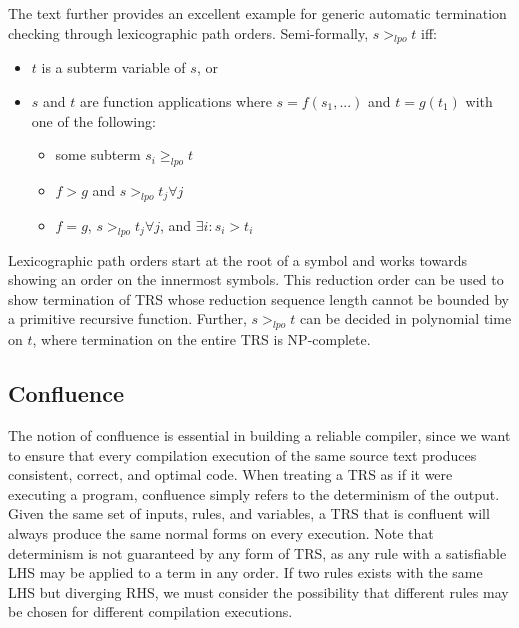 \documentclass{article}
\begin{document}
The text further provides an excellent example for generic automatic termination checking through lexicographic path orders. Semi-formally, $s >_{lpo} t$ iff:
\begin{itemize}
    \item $t$ is a subterm variable of $s$, or
    \item $s$ and $t$ are function applications where $s = f(s_1, ...)$ and $t = g(t_1)$ with one of the following:
    \begin{itemize}
        \item some subterm $s_i \geq_{lpo} t$
        \item $f > g$ and $s >_{lpo} t_j \forall j$
        \item $f = g$, $s >_{lpo} t_j \forall j$, and $\exists i: s_i > t_i$
    \end{itemize}
\end{itemize}
Lexicographic path orders start at the root of a symbol and works towards showing an order on the innermost symbols.
This reduction order can be used to show termination of TRS whose reduction sequence length cannot be bounded by a primitive recursive function.
Further, $s >_{lpo} t$ can be decided in polynomial time on $t$, where termination on the entire TRS is NP-complete.



\subsection{Confluence}
The notion of confluence is essential in building a reliable compiler, since we want to ensure that every
compilation execution of the same source text produces consistent, correct, and optimal code.
When treating a TRS as if it were executing a program, confluence simply refers to the determinism of the output.
Given the same set of inputs, rules, and variables, a TRS that is confluent will always produce the same normal forms
on every execution. Note that determinism is not guaranteed by any form of TRS, as any rule with a satisfiable LHS
may be applied to a term in any order. If two rules exists with the same LHS but diverging RHS, we must consider the possibility
that different rules may be chosen for different compilation executions.
\end{document}
